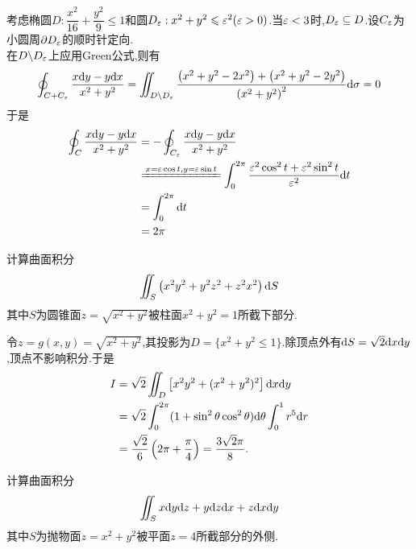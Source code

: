 \documentclass{ctexart}
\begin{document}
\begin{solution}
    考虑椭圆$D:\dfrac{x^2}{16}+\dfrac{y^2}{9}\leqslant1$和圆$D_\varepsilon:x^2+y^2\leqslant\varepsilon^2(\varepsilon>0)$.当$\varepsilon<3$时,$D_\varepsilon\subseteq D$.设$C_\varepsilon$为小圆周$\partial D_\varepsilon$的顺时针定向.\\
    在$D\backslash D_\varepsilon$上应用Green公式,则有
    \[\oint_{C+C_\varepsilon}\dfrac{x\mathrm{d} y-y\mathrm{d} x}{x^2+y^2}
    =\iint_{D\backslash D_\varepsilon}\dfrac{\left(x^2+y^2-2x^2\right)+\left(x^2+y^2-2y^2\right)}{\left(x^2+y^2\right)^2}\mathrm{d}\sigma=0\]
    于是
    \[\begin{aligned}
        \oint_C\dfrac{x\di y-y\di x}{x^2+y^2}
        &= -\oint_{C_\ep}\dfrac{x\di y-y\di x}{x^2+y^2} \\
        &\xlongequal{x=\ep\cos t,y=\ep\sin t} \int_0^{2\pi}\dfrac{\ep^2\cos^2t+\ep^2\sin^2t}{\ep^2}\di t \\
        &= \int_0^{2\pi}\di t \\
        &= 2\pi
    \end{aligned}\]
\end{solution}
\begin{problem}[4.(10\songti{分})]
    计算曲面积分
    \[\iint_{S}\left(x^2y^2+y^2z^2+z^2x^2\right)\mathrm{d} S\]
    其中$S$为圆锥面$z=\sqrt{x^2+y^2}$被柱面$x^2+y^2=1$所截下部分.
\end{problem}
\begin{solution}
令$z=g(x,y)=\sqrt{x^2+y^2}$,其投影为$D=\{x^2+y^2\leqslant1\}$.除顶点外有$\mathrm{d} S=\sqrt2\mathrm{d} x\mathrm{d} y$,顶点不影响积分.于是
    \[\begin{aligned}
        I&=\sqrt2\iint_D\left[x^2y^2+(x^2+y^2)^2\right]\mathrm{d} x\mathrm{d} y\\
        &=\sqrt2\int_0^{2\pi}(1+\sin^2\theta\cos^2\theta)\mathrm{d}\theta\int_0^1r^5\mathrm{d} r\\
        &=\dfrac{\sqrt2}{6}\left(2\pi+\dfrac\pi4\right)=\dfrac{3\sqrt2\pi}{8}.
    \end{aligned}\]
\end{solution}
\begin{problem}[5.(15\songti{分})]
    计算曲面积分
    \[\iint_Sx\mathrm{d} y\mathrm{d} z+y\mathrm{d} z\mathrm{d} x+z\mathrm{d} x\mathrm{d} y\]
    其中$S$为抛物面$z=x^2+y^2$被平面$z=4$所截部分的外侧.
\end{problem}
\end{document}

